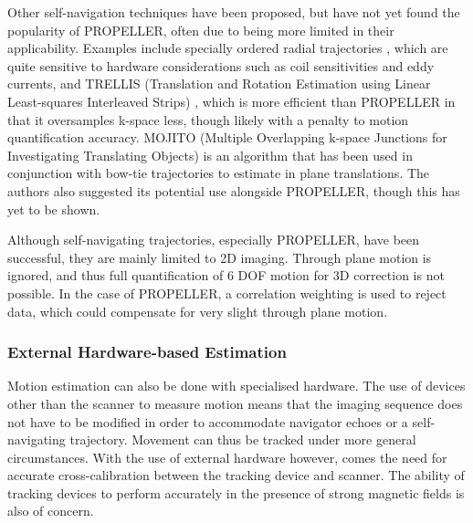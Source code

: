 \documentclass[class=article, crop=false]{standalone}
\begin{document}
Other self-navigation techniques have been proposed, but have not yet found the popularity of PROPELLER, often due to being more limited in their applicability. Examples include specially ordered radial trajectories \parencite{Welch2004a,Kim2008,Anderson2011}, which are quite sensitive to hardware considerations such as coil sensitivities and eddy currents, and TRELLIS (Translation and Rotation Estimation using Linear Least-squares Interleaved Strips) \parencite{Maclaren2008}, which is more efficient than PROPELLER in that it oversamples k-space less, though likely with a penalty to motion quantification accuracy. MOJITO (Multiple Overlapping k-space Junctions for Investigating Translating Objects) \parencite{Bookwalter2010} is an algorithm that has been used in conjunction with bow-tie trajectories to estimate in plane translations. The authors also suggested its potential use alongside PROPELLER, though this has yet to be shown.
\par 
Although self-navigating trajectories, especially PROPELLER, have been successful, they are mainly limited to 2D imaging. Through plane motion is ignored, and thus full quantification of 6 DOF motion for 3D correction is not possible. In the case of PROPELLER, a correlation weighting is used to reject data, which could compensate for very slight through plane motion.

\subsubsection{External Hardware-based Estimation}
Motion estimation can also be done with specialised hardware. The use of devices other than the scanner to measure motion means that the imaging sequence does not have to be modified in order to accommodate navigator echoes or a self-navigating trajectory. Movement can thus be tracked under more general circumstances. With the use of external hardware however, comes the need for accurate cross-calibration between the tracking device and scanner. The ability of tracking devices to perform accurately in the presence of strong magnetic fields is also of concern.
\end{document}
